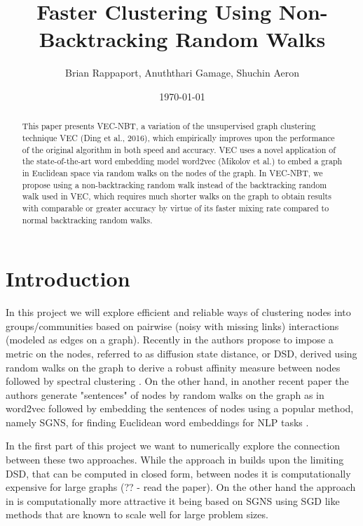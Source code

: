 \documentclass{article}
\title{Faster Clustering Using Non-Backtracking Random Walks}
\author{Brian Rappaport, Anuththari Gamage, Shuchin Aeron}
\affil{Tufts University\\Department of Electrical and Computer Engineering}
\date{\today}
\begin{document}
\maketitle

\begin{abstract}
This paper presents VEC-NBT, a variation of the unsupervised graph clustering
technique VEC (Ding et al., 2016), which empirically improves upon the
performance of the original algorithm in both speed and accuracy. VEC uses a
novel application of the state-of-the-art word embedding model word2vec (Mikolov
et al.) to embed a graph in Euclidean space via random walks on the nodes of the
graph. In VEC-NBT, we propose using a non-backtracking random walk instead of
the backtracking random walk used in VEC, which requires much shorter walks on
the graph to obtain results with comparable or greater accuracy by virtue of its
faster mixing rate compared to normal backtracking random walks.
\end{abstract}


\section{Introduction}

In this project we will explore efficient and reliable ways of clustering nodes
into groups/communities based on pairwise (noisy with missing links)
interactions (modeled as edges on a graph). Recently in \cite{DSD} the authors
propose to impose a metric on the nodes, referred to as diffusion state
distance, or DSD, derived using random walks on the graph to derive a robust
affinity measure between nodes followed by spectral clustering \cite{Luxburg}.
On the other hand, in another recent paper \cite{NodeEmbed} the authors generate
"sentences" of nodes by random walks on the graph as in word2vec \cite{word2vec}
followed by embedding the sentences of nodes using a popular method, namely
SGNS, for finding Euclidean word embeddings for NLP tasks \cite{LevyGoldberg}.

In the first part of this project we want to numerically explore the connection
between these two approaches. While the approach in \cite{DSD} builds upon the
limiting DSD, that can be computed in closed form, between nodes it is
computationally expensive for large graphs (?? - read the paper). On the other
hand the approach in \cite{NodeEmbed} is computationally more attractive it
being based on SGNS using SGD like methods that are known to scale well for
large problem sizes.
\end{document}
